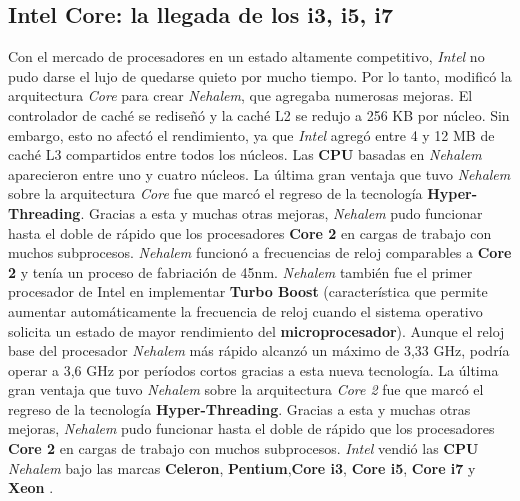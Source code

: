 \subsection{Intel Core: la llegada de los i3, i5, i7}
Con el mercado de procesadores en un estado altamente competitivo, \emph{Intel} no pudo darse el lujo de quedarse quieto por mucho tiempo. 
Por lo tanto, modificó la arquitectura \emph{Core} para crear \emph{Nehalem}, que agregaba numerosas mejoras. El controlador de caché se rediseñó y 
la caché L2 se redujo a 256 KB por núcleo. Sin embargo, esto no afectó el rendimiento, ya que \emph{Intel} agregó entre 4 y 12 MB de caché L3 
compartidos entre todos los núcleos. Las \textbf{CPU} basadas en \emph{Nehalem} aparecieron entre uno y cuatro núcleos. La última gran 
ventaja que tuvo \emph{Nehalem} sobre la arquitectura \emph{Core} fue que marcó el regreso de la tecnología \textbf{Hyper-Threading}. Gracias a esta y 
muchas otras mejoras, \emph{Nehalem} pudo funcionar hasta el doble de rápido que los procesadores \textbf{Core 2} en cargas de trabajo con muchos 
subprocesos. \emph{Nehalem} funcionó a frecuencias de reloj comparables a \textbf{Core 2} y tenía un proceso de fabriación de 45nm. 
\emph{Nehalem} también fue el primer procesador de Intel en implementar \textbf{Turbo Boost} (característica que permite aumentar automáticamente la frecuencia 
de reloj cuando el sistema operativo solicita un estado de mayor rendimiento del \textbf{microprocesador}). Aunque el reloj base del procesador \emph{Nehalem} más rápido 
alcanzó un máximo de 3,33 GHz, podría operar a 3,6 GHz por períodos cortos gracias a esta nueva tecnología. La última gran ventaja que tuvo 
\emph{Nehalem} sobre la arquitectura \emph{Core 2} fue que marcó el regreso de la tecnología \textbf{Hyper-Threading}. 
Gracias a esta y muchas otras mejoras, \emph{Nehalem} pudo funcionar hasta el doble de rápido que los procesadores \textbf{Core 2} en cargas de trabajo con 
muchos subprocesos. \emph{Intel} vendió las \textbf{CPU} \emph{Nehalem} bajo las marcas \textbf{Celeron}, \textbf{Pentium},\textbf{Core i3}, \textbf{Core i5}, 
\textbf{Core i7} y \textbf{Xeon} .\\

